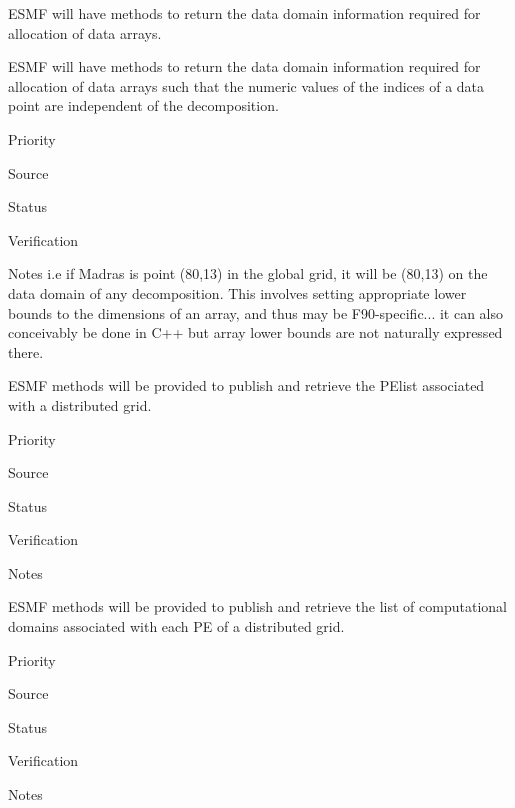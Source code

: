 ESMF will have methods to return the data domain information required
for allocation of data arrays.


ESMF will have methods to return the data domain information required
for allocation of data arrays such that the numeric values of the
indices of a data point are independent of the decomposition.

\begin{reqlist}
\item[Priority]
\item[Source]
\item[Status]
\item[Verification]
\item[Notes] i.e if Madras is point (80,13) in the global grid, it
  will be (80,13) on the data domain of any decomposition. This
  involves setting appropriate lower bounds to the dimensions of an
  array, and thus may be F90-specific... it can also conceivably be
  done in C++ but array lower bounds are not naturally expressed
  there.
\end{reqlist}



ESMF methods will be provided to publish and retrieve the PElist
associated with a distributed grid.

\begin{reqlist}
\item[Priority]
\item[Source]
\item[Status]
\item[Verification]
\item[Notes]
\end{reqlist}


ESMF methods will be provided to publish and retrieve the list of
computational domains associated with each PE of a distributed grid.

\begin{reqlist}
\item[Priority]
\item[Source]
\item[Status]
\item[Verification]
\item[Notes]
\end{reqlist}

